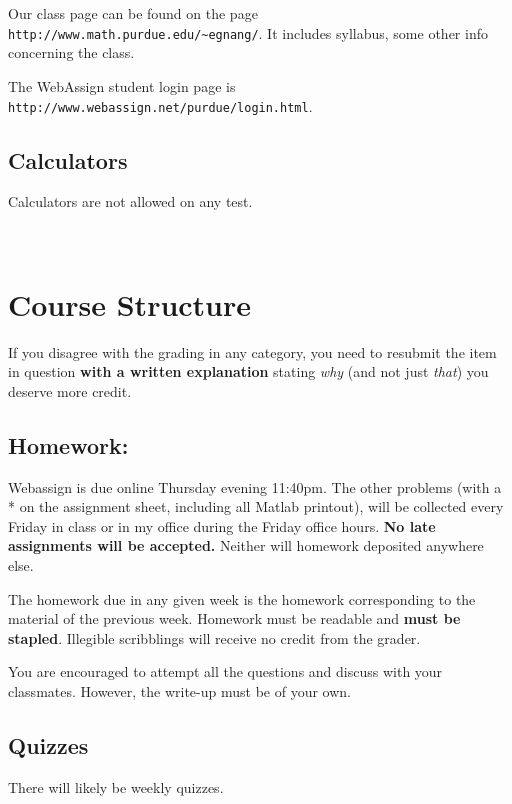 \documentclass[10pt]{article}
\begin{document}
\noindent Our class page can be found on the page {\tt
http://www.math.purdue.edu/\~{}egnang/}. It includes
syllabus, some other info concerning the class. \smallskip


\noindent The WebAssign student login page is {\tt http://www.webassign.net/purdue/login.html}.



\subsection{Calculators}
Calculators are not allowed on any test.


\newpage 
~
\vspace{-3cm}
\section{Course Structure}

If you disagree with the grading in any category, you need to resubmit
the item in question {\bf with a written explanation} stating {\em why}
(and not just {\em that}) you deserve more credit. 
\subsection{Homework:}   
        Webassign is due online Thursday evening 11:40pm.  The
        other problems (with a * on the assignment sheet, including
        all Matlab printout), will be collected every Friday in
        class or in my office during the Friday office hours.  
        {\bf No late assignments will be accepted.}  Neither will 
        homework deposited anywhere else.

	The homework due in any given week is the
	homework corresponding to the material of the previous
	week. Homework must be readable and {\bf must be stapled}. Illegible
	scribblings will receive no credit from the grader.

        You are encouraged to attempt all the questions and discuss
        with your classmates. However, the write-up must
        be of your own.

\subsection{Quizzes}
There will likely be weekly quizzes.
\end{document}
